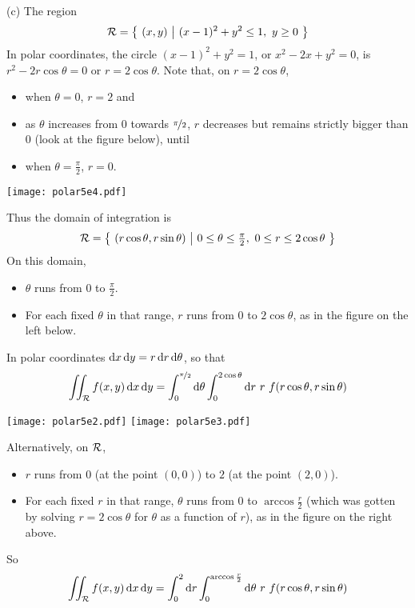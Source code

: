 \begin{solution}
(c) The region 
\begin{equation*}
\mathcal{R}=\big\{ \ (x,y)\ \big|\ (x-1)^2+y^2\le 1,\ y \ge 0\ \big\}
\end{equation*}
In polar coordinates, the circle $(x-1)^2+y^2= 1$, or $x^2-2x+y^2=0$,
is $r^2-2r\cos\theta=0$ or $r=2\cos\theta$. Note that, on $r=2\cos\theta$,
\begin{itemize}
\item
when $\theta=0$, $r=2$ and
\item
as $\theta$ increases from $0$ towards $\nicefrac{\pi}{2}$, $r$ decreases but remains strictly bigger than $0$ (look at the figure below), until
\item
when $\theta=\frac{\pi}{2}$, $r=0$.
\end{itemize}
\begin{center}
     \texttt{[image: polar5e4.pdf]}
\end{center}
Thus the domain of integration is
\begin{equation*}
\cR=\Set{(r\cos\theta,r\sin\theta)}{0\le\theta\le\tfrac{\pi}{2},\ 
          0\le r\le 2\cos\theta}
\end{equation*}
On this domain,
\begin{itemize}
\item 
$\theta$ runs from $0$ to $\frac{\pi}{2}$. 
\item
For each fixed $\theta$ in that range, $r$ runs from $0$ to $2\cos\theta$, 
as in the figure on the left below.
\end{itemize}
In polar coordinates $\mathrm{d}x\,\mathrm{d}y = r\,\mathrm{d}r\,\mathrm{d}\theta$, so that
\begin{equation*}
\iint_{\mathcal{R}} f(x,y)\,\mathrm{d}x\,\mathrm{d}y
=\int_0^{\nicefrac{\pi}{2}}\mathrm{d}\theta
 \int_0^{2\cos\theta}\mathrm{d}r\ r\ f(r\cos\theta,r\sin\theta)
\end{equation*}
\begin{center}
     \texttt{[image: polar5e2.pdf]}\qquad\qquad
     \texttt{[image: polar5e3.pdf]}
\end{center}
Alternatively, on $\mathcal{R}$,
\begin{itemize}
\item 
$r$ runs from $0$ (at the point $(0,0)$)  
to $2$ (at the point $(2,0)$). 
\item
For each fixed $r$ in that range, $\theta$ runs 
from $0$ to $\arccos\frac{r}{2}$ (which was gotten by solving 
$r=2\cos\theta$ for $\theta$ as a function of $r$), as in the figure 
on the right above.
\end{itemize}
So 
\begin{equation*}
\iint_{\mathcal{R}} f(x,y)\,\mathrm{d}x\,\mathrm{d}y
=\int_0^2\mathrm{d}r
  \int_0^{\arccos\frac{r}{2}}\mathrm{d}\theta
 \ r\ f(r\cos\theta,r\sin\theta)
\end{equation*}



\end{solution}
